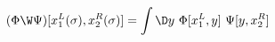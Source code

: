 \begin{equation}\label{eq15:ps}
	(\Phi\W\Psi)[x^{L}_{1}(\sigma),x^{R}_{2}(\sigma)]=\int\D y~ \Phi[x^{L}_{1},y]~\Psi[y,x_{2}^{R}]
\end{equation}

